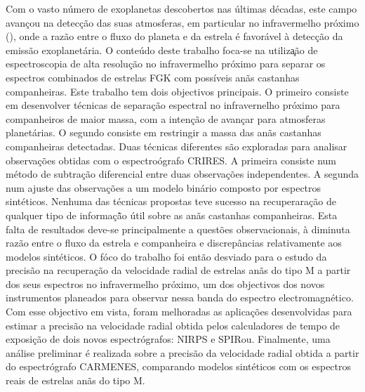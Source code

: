 
\begin{abstract-pt}
    Com o vasto n\'{u}mero de exoplanetas descobertos nas \'{u}ltimas d\'{e}cadas, este campo avan\c{c}ou na detec\c{c}\~{a}o das suas atmosferas, em particular no infravermelho pr\'{o}ximo (\nir{}), onde a razão entre o fluxo do planeta e da estrela \'{e} favor\'{a}vel \`{a} detec\c{c}\~{a}o da emiss\~{a}o exoplanet\'{a}ria.
    O conte\'{u}do deste trabalho foca-se na utiliza\c{}\~{a}o de espectroscopia de alta resolu\c{c}\~{a}o no infravermelho pr\'{o}ximo para separar os espectros combinados de estrelas {FGK} com possíveis an\~{a}s castanhas companheiras.
    Este trabalho tem dois objectivos principais. O primeiro consiste em desenvolver t\'{e}cnicas de separa\c{c}\~{a}o espectral no infravernelho pr\'{o}ximo para companheiros de maior massa, com a inten\c{c}\~{a}o de avan\c{c}ar para atmosferas planet\'{a}rias. O segundo consiste em restringir a massa das an\~{a}s castanhas companheiras detectadas.
    Duas t\'{e}cnicas diferentes s\~{a}o exploradas para analisar observa\c{c}\~{o}es obtidas com o espectro\'{o}grafo {CRIRES}. A primeira consiste num m\'{e}todo de subtra\c{c}\~{a}o diferencial entre duas observa\c{c}\~{o}es independentes. A segunda num ajuste \textchisquared{} das observa\c{c}\~{o}es a um modelo bin\'{a}rio composto por espectros sint\'{e}ticos.
    Nenhuma das t\'{e}cnicas propostas teve sucesso na recuperara\c{c}\~{a}o de qualquer tipo de informa\c{c}\~{ã}o \'{u}til sobre as an\~{a}s castanhas companheiras. Esta falta de resultados deve-se principalmente a quest\~{o}es observacionais, \`{a} diminuta raz\~{a}o entre o fluxo da estrela e companheira e discrep\^{a}ncias relativamente aos modelos sint\'{e}ticos.
    O f\'{o}co do trabalho foi ent\~{a}o desviado para o estudo da precis\~{a}o na recuperação da velocidade radial de estrelas an\~{a}s do tipo M a partir dos seus espectros no infravermelho pr\'{o}ximo, um dos objectivos dos novos instrumentos planeados para observar nessa banda do espectro electromagn\'{e}tico.
    Com esse objectivo em vista, foram melhoradas as aplica\c{c}\~{o}es desenvolvidas para estimar a precis\~{a}o na velocidade radial obtida pelos calculadores de tempo de exposi\c{c}\~{a}o de dois novos \nir{} espectr\'{o}grafos: {NIRPS} e {SPIRou}.
    Finalmente, uma an\'{a}lise preliminar \'{e} realizada sobre a precis\~{a}o da velocidade radial obtida a partir do espectr\'{o}grafo {CARMENES}, comparando modelos sint\'{e}ticos com os espectros reais de estrelas an\~{a}s do tipo M.


\end{abstract-pt}
